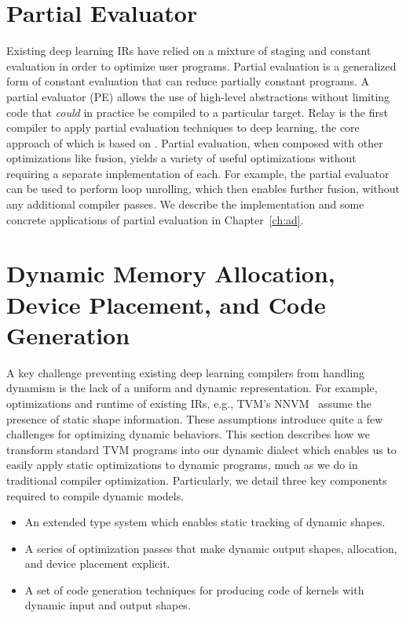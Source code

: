 \section{Partial Evaluator}
\label{sec:t formartial_eval}
Existing deep learning IRs have relied on
  a mixture of staging and constant evaluation
  in order to optimize user programs.
Partial evaluation is a generalized form of constant
  evaluation that can reduce partially constant
  programs.
A partial evaluator (PE) allows the use of high-level abstractions
  without limiting code that \textit{could} in practice be
  compiled to a particular target.
Relay is the first compiler to apply partial evaluation
  techniques to deep learning, the
  core approach of which is based on \citep{pe_ref}.
Partial evaluation, when composed with other
  optimizations like fusion, yields a variety
  of useful optimizations without requiring
  a separate implementation of each.
For example, the partial evaluator can be used to perform
  loop unrolling, which then enables further fusion,
  without any additional compiler passes.
We describe the implementation and some
  concrete applications of partial evaluation
  in Chapter~\ref{ch:ad}.

\section{Dynamic Memory Allocation, Device Placement, and Code Generation}

A key challenge preventing existing deep learning compilers from handling dynamism
  is the lack of a uniform and dynamic representation.
For example, optimizations and runtime of existing IRs,
  e.g., TVM's NNVM~\citep{tvm_osdi18} assume the presence of static shape information.
These assumptions introduce quite a few challenges for optimizing dynamic behaviors.
This section describes how we transform standard TVM programs into our dynamic dialect
  which enables us to easily apply static optimizations to dynamic programs, much as we
  do in traditional compiler optimization.
Particularly, we detail three key components required to compile dynamic models.

\begin{itemize}
    \item An extended type system which enables static tracking of dynamic shapes.
    \item A series of optimization passes that make dynamic output shapes, allocation,
          and device placement explicit.
    \item A set of code generation techniques for producing code of kernels with dynamic input
          and output shapes.
\end{itemize}


